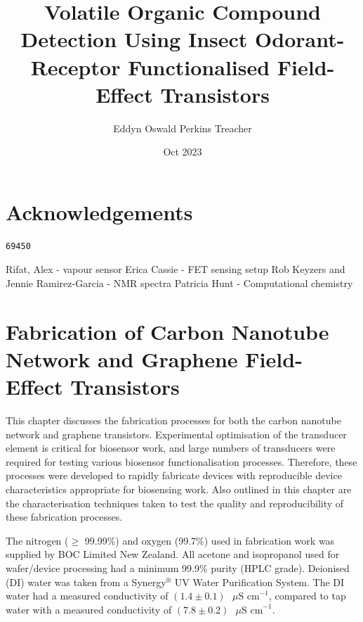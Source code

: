 \documentclass[
  a4paper,
]{scrbook}
\title{Volatile Organic Compound Detection Using Insect Odorant-Receptor
Functionalised Field-Effect Transistors}
\author{Eddyn Oswald Perkins Treacher}
\date{Oct 2023}
\begin{document}
\frontmatter
\maketitle
\ifdefined\Shaded\renewenvironment{Shaded}{\begin{tcolorbox}[frame hidden, boxrule=0pt, sharp corners, breakable, borderline west={3pt}{0pt}{shadecolor}, interior hidden, enhanced]}{\end{tcolorbox}}\fi

\mainmatter
{}

\hypertarget{acknowledgements}{%
\chapter*{Acknowledgements}\label{acknowledgements}}


\begin{verbatim}
69450
\end{verbatim}

Rifat, Alex - vapour sensor Erica Cassie - FET sensing setup Rob Keyzers
and Jennie Ramirez-Garcia - NMR spectra Patricia Hunt - Computational
chemistry


\hypertarget{sec-fabrication}{%
\chapter{Fabrication of Carbon Nanotube Network and Graphene
Field-Effect Transistors}\label{sec-fabrication}}

This chapter discusses the fabrication processes for both the carbon
nanotube network and graphene transistors. Experimental optimisation of
the transducer element is critical for biosensor work, and large numbers
of transducers were required for testing various biosensor
functionalisation processes. Therefore, these processes were developed
to rapidly fabricate devices with reproducible device characteristics
appropriate for biosensing work. Also outlined in this chapter are the
characterisation techniques taken to test the quality and
reproducibility of these fabrication processes.

The nitrogen (\(\geq\) 99.99\%) and oxygen (99.7\%) used in fabrication
work was supplied by BOC Limited New Zealand. All acetone and
isopropanol used for wafer/device processing had a minimum 99.9\% purity
(HPLC grade). Deionised (DI) water was taken from a
Synergy\(^\circledR\) UV Water Purification System. The DI water had a
measured conductivity of
\((1.4\pm0.1)\textrm{ } \mu \textrm{S cm}^{-1}\), compared to tap water
with a measured conductivity of
\((7.8\pm0.2)\textrm{ } \mu \textrm{S cm}^{-1}\).
\end{document}
